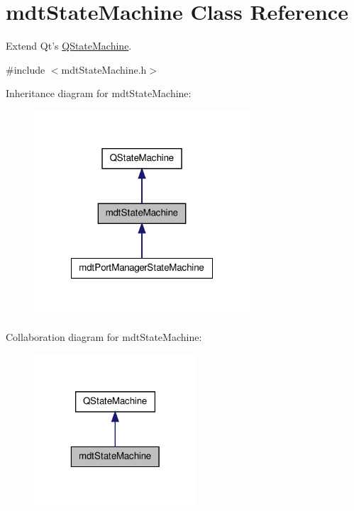 \hypertarget{classmdt_state_machine}{\section{mdt\-State\-Machine Class Reference}
\label{classmdt_state_machine}
}


Extend Qt's \hyperlink{class_q_state_machine}{Q\-State\-Machine}.  




{\ttfamily \#include $<$mdt\-State\-Machine.\-h$>$}



Inheritance diagram for mdt\-State\-Machine\-:
\nopagebreak
\begin{figure}[H]
\begin{center}
\leavevmode
\includegraphics[width=228pt]{classmdt_state_machine__inherit__graph}
\end{center}
\end{figure}


Collaboration diagram for mdt\-State\-Machine\-:
\nopagebreak
\begin{figure}[H]
\begin{center}
\leavevmode
\includegraphics[width=172pt]{classmdt_state_machine__coll__graph}
\end{center}
\end{figure}
